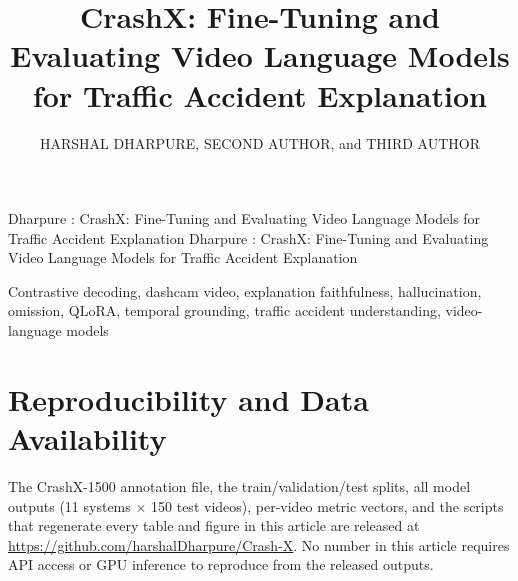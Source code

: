 \documentclass{ieeeaccess}
\newcommand{\dataset}{CrashX-1500}
\begin{document}

\title{CrashX: Fine-Tuning and Evaluating Video Language Models for Traffic Accident Explanation}

\author{\uppercase{Harshal Dharpure},
\uppercase{Second Author},
and \uppercase{Third Author}}

\address[1]{Department of Computer Science and Engineering, Institution Name, City, Country (e-mail: author@institution.edu)}


\markboth
{Dharpure \headeretal: CrashX: Fine-Tuning and Evaluating Video Language Models for Traffic Accident Explanation}
{Dharpure \headeretal: CrashX: Fine-Tuning and Evaluating Video Language Models for Traffic Accident Explanation}


\begin{abstract}

\end{abstract}

\begin{keywords}
Contrastive decoding, dashcam video, explanation faithfulness, hallucination, omission, QLoRA, temporal grounding, traffic accident understanding, video-language models
\end{keywords}

\titlepgskip=-21pt

\maketitle













\appendix


\section*{Reproducibility and Data Availability}
The \dataset{} annotation file, the train/validation/test splits, all model outputs
(11 systems $\times$ 150 test videos), per-video metric vectors, and the scripts that
regenerate every table and figure in this article are released at
\url{https://github.com/harshalDharpure/Crash-X}.
No number in this article requires API access or GPU inference to reproduce from the
released outputs.
\end{document}
